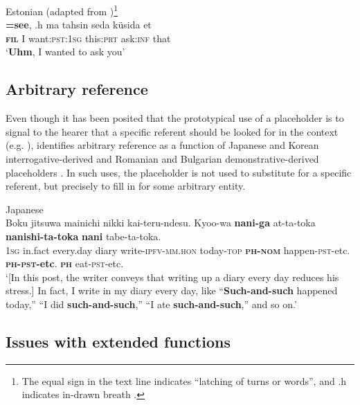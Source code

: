 \documentclass[output=paper]{langscibook}
\begin{document}
\ea\label{ex:intro:20}
{Estonian (adapted from \citealt[164]{Keevallik2010})\footnote{The equal sign in the text line indicates “latching of turns or words”, and .h indicates in-drawn breath \citep[171]{Keevallik2010}.}}\\
\gll \textbf{=see}, .h ma tahsin seda küsida et\\
     \textbf{\textsc{fil}} {} I want:\textsc{pst:1sg} this:\textsc{prt} ask:\textsc{inf} that\\
\glt ‘\textbf{Uhm}, I wanted to ask you’
\z

\subsection{Arbitrary reference}\label{sec:intro:5.3}

Even though it has been posited that the prototypical use of a placeholder is to signal to the hearer that a specific referent should be looked for in the context (e.g. \citealt[300]{Hennecke2022}), \citet{Seraku2022b} identifies arbitrary reference as a function of Japanese and Korean interrogative-derived and Romanian and Bulgarian demonstrative-derived placeholders . In such uses, the placeholder is not used to substitute for a specific referent, but precisely to fill in for some arbitrary entity. 

\ea\label{ex:intro:21}
{Japanese \citep[436]{Seraku2022b}}\\
\gll Boku jitsuwa mainichi nikki kai-teru-ndesu. Kyoo-wa \textbf{nani-ga} at-ta-toka \textbf{nanishi-ta-toka} \textbf{nani} tabe-ta-toka.\\
     1\textsc{sg} in.fact every.day diary write-\textsc{ipfv-mm.hon} today-\textsc{top} \textbf{\textsc{ph-nom}} happen-\textsc{pst}-etc. \textbf{\textsc{ph-pst}-etc}. \textbf{\textsc{ph}} eat-\textsc{pst}-etc.\\
\glt ‘[In this post, the writer conveys that writing up a diary every day reduces his stress.] In fact, I write in my diary every day, like “\textbf{Such-and-such} happened today,” “I did \textbf{such-and-such},” “I ate \textbf{such-and-such},” and so on.’ 
\z

\subsection{Issues with extended functions}\label{sec:intro:5.4}
\end{document}
